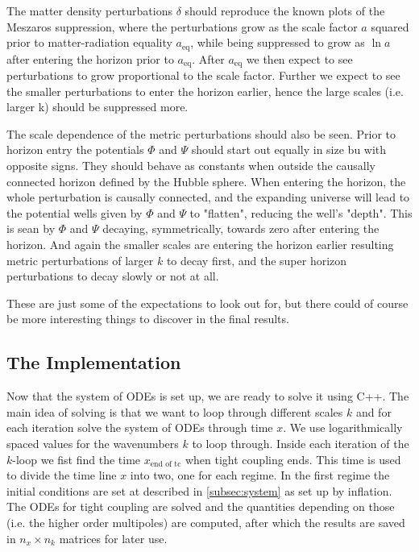 \documentclass[twocolumn]{aastex62}
\begin{document}
The matter density perturbations $\delta$ should reproduce the known plots of the Meszaros suppression, where the perturbations grow as the scale factor $a$ squared prior to matter-radiation equality $a_\text{eq}$, while being suppressed to grow as $\ln a$ after entering the horizon prior to $a_\text{eq}$. After $a_\text{eq}$ we then expect to see perturbations to grow proportional to the scale factor. Further we expect to see the smaller perturbations to enter the horizon earlier, hence the large scales (i.e. larger k) should be suppressed more.

The scale dependence of the metric perturbations should also be seen. Prior to horizon entry the potentials $\Phi$ and $\Psi$ should start out equally in size bu with opposite signs. They should behave as constants when outside the causally connected horizon defined by the Hubble sphere. When entering the horizon, the whole perturbation is causally connected, and the expanding universe will lead to the potential wells given by $\Phi$ and $\Psi$ to "flatten", reducing the well's "depth". This is sean by $\Phi$ and $\Psi$ decaying, symmetrically, towards zero after entering the horizon. And again the smaller scales are entering the horizon earlier resulting metric perturbations of larger $k$ to decay first, and the super horizon perturbations to decay slowly or not at all. 

These are just some of the expectations to look out for, but there could of course be more interesting things to discover in the final results.




\subsection{The Implementation} \label{subsec:implementation}
Now that the system of ODEs is set up, we are ready to solve it using C++. The main idea of solving is that we want to loop through different scales $k$ and for each iteration solve the system of ODEs through time $x$. We use logarithmically spaced values for the wavenumbers $k$ to loop through. Inside each iteration of the $k$-loop we fist find the time $x_\text{end of tc}$ when tight coupling ends. This time is used to divide the time line $x$ into two, one for each regime. In the first regime the initial conditions are set at described in \ref{subsec:system} as set up by inflation. The ODEs for tight coupling are solved and the quantities depending on those (i.e. the higher order multipoles) are computed, after which the results are saved in $n_x\times n_k$ matrices for later use.
\end{document}
